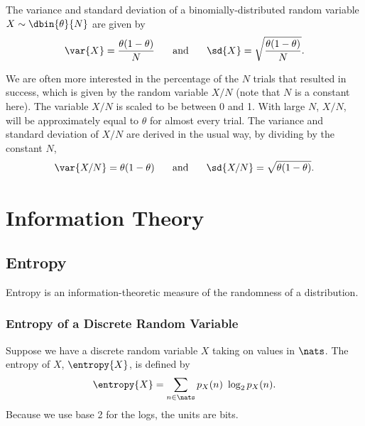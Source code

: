 The variance and standard deviation of a binomially-distributed random
variable $X \sim \dbin{\theta}{N}$ are given by
%
\begin{equation}
\hfill
\var{X} = \frac{\theta (1 - \theta)}{N} 
\hspace*{0.25in}
\mbox{and}
\hspace*{0.25in}
\sd{X} = \sqrt{\frac{\theta (1 - \theta)}{N}}.
\hfill
\end{equation}
%

We are often more interested in the percentage of the $N$ trials that
resulted in success, which is given by the random variable $X/N$ (note
that $N$ is a constant here).  The variable $X/N$ is scaled to be
between 0 and 1.  With large $N$, $X/N$, will be approximately equal
to $\theta$ for almost every trial.  The variance and standard
deviation of $X/N$ are derived in the usual way, by dividing by the
constant $N$,
%
\begin{equation}
\var{X/N} = \theta (1 - \theta) 
\hspace*{0.25in}
\mbox{and}
\hspace*{0.25in}
\sd{X/N} = \sqrt{\theta (1-\theta)}.
\end{equation}



\section{Information Theory}

\subsection{Entropy}\label{section:stats-entropy}

Entropy is an information-theoretic measure of the randomness of a
distribution.  

\subsubsection{Entropy of a Discrete Random Variable}

Suppose we have a discrete random variable $X$ taking
on values in $\nats$.  The entropy of $X$, $\entropy{X}$, is defined by
%
\begin{equation}
\entropy{X} = \sum_{n \in \nats} p_X(n) \ \log_2 p_X(n).
\end{equation}
%
Because we use base 2 for the logs, the units are bits.  

